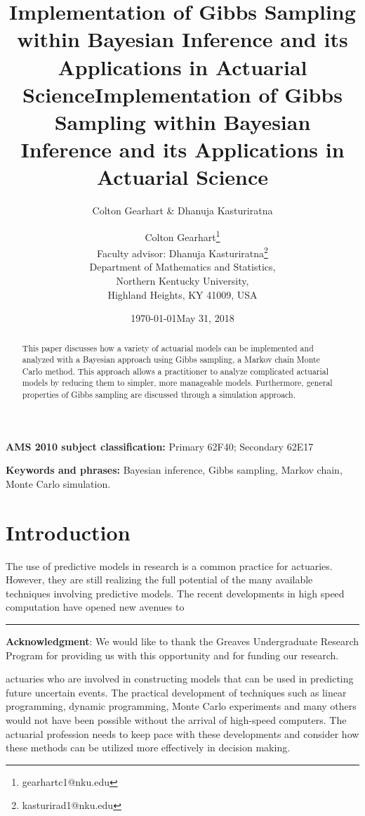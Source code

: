 \documentclass[11pt, oneside]{article}
\title{Implementation of Gibbs Sampling within Bayesian Inference and its Applications in Actuarial Science}
\author{Colton Gearhart \& Dhanuja Kasturiratna}
\date{\today}
\begin{document}
\title{\Large\bf Implementation of Gibbs Sampling within Bayesian Inference and its Applications in Actuarial Science}
\author{\normalsize Colton Gearhart\footnote {gearhartc1@nku.edu}\\
\normalsize Faculty advisor: Dhanuja Kasturiratna\footnote {kasturirad1@nku.edu}\\
[3pt]\normalsize Department of Mathematics and Statistics,\\
\normalsize Northern Kentucky University,\\
\normalsize Highland Heights, KY 41009, USA\\
\date{May 31, 2018}\vspace{-15pt}}%

\maketitle

\begin{abstract}

This paper discusses how a variety of actuarial models can be implemented and analyzed with a Bayesian approach using Gibbs sampling, a Markov chain Monte Carlo method. This approach allows a practitioner to analyze complicated actuarial models by reducing them to simpler, more manageable models. Furthermore, general properties of Gibbs sampling are discussed through a simulation approach.
\end{abstract}

\textbf{AMS 2010 subject classification:} Primary 62F40; Secondary 62E17

\textbf{Keywords and phrases:} Bayesian inference, Gibbs sampling, Markov chain, Monte Carlo simulation.

\section{Introduction}

The use of predictive models in research is a common practice for actuaries. However, they are still realizing the full potential of the many available techniques involving predictive models. The recent developments in high speed computation have opened new avenues to\vspace{10pt}\hrule \small{\textbf{Acknowledgment}: We would like to thank the Greaves Undergraduate Research Program for providing us with this opportunity and for funding our research.}

actuaries who are involved in constructing models that can be used in predicting future uncertain events. The practical development of techniques such as linear programming, dynamic programming, Monte Carlo experiments and many others would not have been possible without the arrival of high-speed computers. The actuarial profession needs to keep pace with these developments and consider how these methods can be utilized more effectively in decision making.
\end{document}

